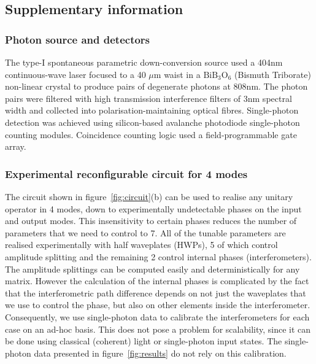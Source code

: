 \subsection{Supplementary information}
\subsubsection{Photon source and detectors}
The type-I spontaneous parametric down-conversion source used a 404nm
continuous-wave laser focused to a 40 \(\mu\)m waist in a \(\text{BiB}_3
\text{O}_6\) (Bismuth Triborate) non-linear crystal to produce pairs of
degenerate photons at 808nm. The photon pairs were filtered with high
transmission interference filters of 3nm spectral width and collected into
polarisation-maintaining optical fibres. Single-photon detection was achieved
using silicon-based avalanche photodiode single-photon counting modules.
Coincidence counting logic used a field-programmable gate array.

\subsubsection{Experimental reconfigurable circuit for 4 modes}
The circuit shown in figure~\ref{fig:circuit}(b) can be used to realise any
unitary operator in 4 modes, down to experimentally undetectable phases on the
input and output modes. This insensitivity to certain phases reduces the number
of parameters that we need to control to 7. All of the tunable parameters are
realised experimentally with half waveplates (HWPs), 5 of which control
amplitude splitting and the remaining 2 control internal phases
(interferometers). The amplitude
splittings can be computed easily and deterministically for any matrix. However
the calculation of the internal phases is complicated by the fact that the
interferometric path difference depends on not just the waveplates
that we use to control the phase, but also on other elements inside the
interferometer. Consequently, we use single-photon data to calibrate the
interferometers for each case on an ad-hoc basis. This does not pose a problem
for scalability, since it can be done using classical (coherent) light or
single-photon input states. The single-photon data presented in
figure~\ref{fig:results} do not rely on this calibration.

